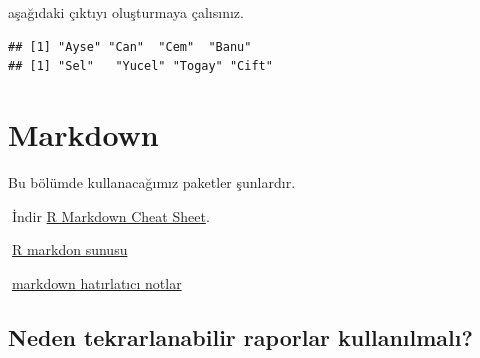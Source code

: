 \documentclass[
  oneside]{book}
\newenvironment{Shaded}{\begin{snugshade}}{\end{snugshade}}
\newcommand{\AttributeTok}[1]{\textcolor[rgb]{0.13,0.29,0.53}{#1}}
\newcommand{\CommentTok}[1]{\textcolor[rgb]{0.56,0.35,0.01}{\textit{#1}}}
\newcommand{\ConstantTok}[1]{\textcolor[rgb]{0.56,0.35,0.01}{#1}}
\newcommand{\FunctionTok}[1]{\textcolor[rgb]{0.13,0.29,0.53}{\textbf{#1}}}
\newcommand{\NormalTok}[1]{#1}
\newcommand{\SpecialCharTok}[1]{\textcolor[rgb]{0.81,0.36,0.00}{\textbf{#1}}}
\begin{document}
aşağıdaki çıktıyı oluşturmaya çalısınız.

\begin{verbatim}
## [1] "Ayse" "Can"  "Cem"  "Banu"
## [1] "Sel"   "Yucel" "Togay" "Cift"
\end{verbatim}

\hypertarget{markdown}{%
\chapter{Markdown}\label{markdown}}

Bu bölümde kullanacağımız paketler şunlardır.

\begin{Shaded}
\end{Shaded}

🔗İndir \href{https://www.rstudio.org/links/r_markdown_cheat_sheet}{R Markdown Cheat Sheet}.

\begin{try}
🔗\href{https://atalay-k.github.io/OLC750/sunu/T_Dokumantasyon.html\#1}{R markdon sunusu}

\end{try}

\begin{try}
🔗\href{https://www.markdownguide.org/cheat-sheet/}{markdown hatırlatıcı notlar}

\end{try}

\hypertarget{neden-tekrarlanabilir-raporlar-kullanux131lmalux131}{%
\section{Neden tekrarlanabilir raporlar kullanılmalı?}\label{neden-tekrarlanabilir-raporlar-kullanux131lmalux131}}
\end{document}
